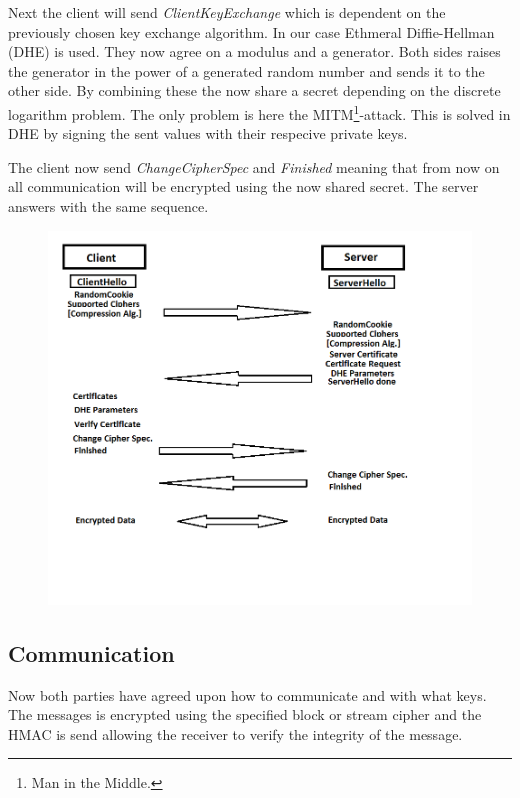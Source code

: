 \documentclass[10pt, a4paper]{article}
\begin{document}
Next the client will send \emph{ClientKeyExchange} which is dependent on the previously chosen key exchange algorithm. In our case Ethmeral Diffie-Hellman (DHE) is used. They now agree on a modulus and a generator. Both sides raises the generator in the power of a generated random number and sends it to the other side. By combining these the now share a secret depending on the discrete logarithm problem. The only problem is here the MITM\footnote{Man in the Middle.}-attack. This is solved in DHE by signing the sent values  with their respecive private keys.

The client now send \emph{ChangeCipherSpec} and \emph{Finished} meaning that from now on all communication will be encrypted using the now shared secret. The server answers with the same sequence.

\begin{figure}[hbt]
  \begin{center}
    \includegraphics[scale=0.6]{protocol.png}
  \end{center}
\end{figure}

\subsection{Communication}
Now both parties have agreed upon how to communicate and with what keys. The messages is encrypted using the specified block or stream cipher and the HMAC is send allowing the receiver to verify the integrity of the message.
\end{document}

